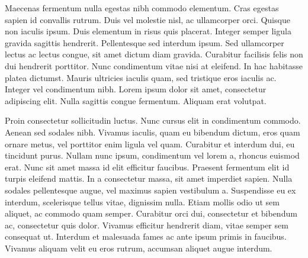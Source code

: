 Maecenas fermentum nulla egestas nibh commodo elementum. Cras egestas sapien id convallis rutrum. Duis vel molestie nisl, ac ullamcorper orci. Quisque non iaculis ipsum. Duis elementum in risus quis placerat. Integer semper ligula gravida sagittis hendrerit. Pellentesque sed interdum ipsum. Sed ullamcorper lectus ac lectus congue, sit amet dictum diam gravida. Curabitur facilisis felis non dui hendrerit porttitor. Nunc condimentum vitae nisi at eleifend. In hac habitasse platea dictumst. Mauris ultricies iaculis quam, sed tristique eros iaculis ac. Integer vel condimentum nibh. Lorem ipsum dolor sit amet, consectetur adipiscing elit. Nulla sagittis congue fermentum. Aliquam erat volutpat.

Proin consectetur sollicitudin luctus. Nunc cursus elit in condimentum commodo. Aenean sed sodales nibh. Vivamus iaculis, quam eu bibendum dictum, eros quam ornare metus, vel porttitor enim ligula vel quam. Curabitur et interdum dui, eu tincidunt purus. Nullam nunc ipsum, condimentum vel lorem a, rhoncus euismod erat. Nunc sit amet massa id elit efficitur faucibus. Praesent fermentum elit id turpis eleifend mattis. In a consectetur massa, sit amet imperdiet sapien. Nulla sodales pellentesque augue, vel maximus sapien vestibulum a. Suspendisse eu ex interdum, scelerisque tellus vitae, dignissim nulla. Etiam mollis odio ut sem aliquet, ac commodo quam semper. Curabitur orci dui, consectetur et bibendum ac, consectetur quis dolor. Vivamus efficitur hendrerit diam, vitae semper sem consequat ut. Interdum et malesuada fames ac ante ipsum primis in faucibus. Vivamus aliquam velit eu eros rutrum, accumsan aliquet augue interdum.